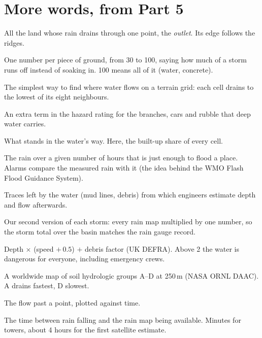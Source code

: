 \section{More words, from Part 5}
\small
\begin{description}[leftmargin=3.2cm,style=nextline,itemsep=0.25em]
\item[Basin (catchment)] All the land whose rain drains through one point, the \emph{outlet}. Its edge follows the ridges.
\item[Curve number (CN)] One number per piece of ground, from 30 to 100, saying how much of a storm runs off instead of
soaking in. 100 means all of it (water, concrete).
\item[D8] The simplest way to find where water flows on a terrain grid: each cell drains to the lowest of its eight
neighbours.
\item[Debris factor] An extra term in the hazard rating for the branches, cars and rubble that deep water carries.
\item[Exposure] What stands in the water's way. Here, the built-up share of every cell.
\item[Flash-flood threshold] The rain over a given number of hours that is just enough to flood a place. Alarms compare
the measured rain with it (the idea behind the WMO Flash Flood Guidance System).
\item[Flood marks] Traces left by the water (mud lines, debris) from which engineers estimate depth and flow afterwards.
\item[Gauge-matched storm] Our second version of each storm: every rain map multiplied by one number, so the storm total
over the basin matches the rain gauge record.
\item[Hazard rating] Depth $\times$ (speed $+\,0.5$) $+$ debris factor (UK DEFRA). Above 2 the water is dangerous for
everyone, including emergency crews.
\item[HYSOGs250m] A worldwide map of soil hydrologic groups A--D at 250\,m (NASA ORNL DAAC). A drains fastest, D slowest.
\item[Hydrograph] The flow past a point, plotted against time.
\item[Latency] The time between rain falling and the rain map being available. Minutes for towers, about 4 hours for the
first satellite estimate.

\end{description}
